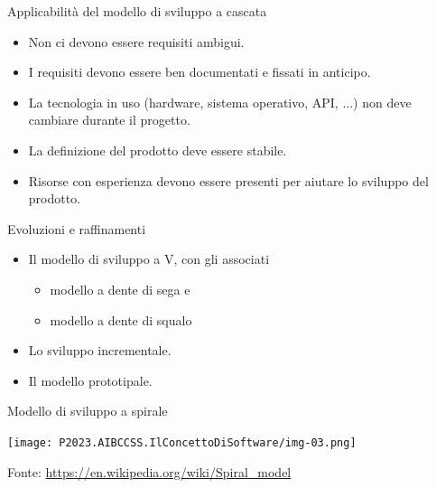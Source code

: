 \documentclass{beamer}
\begin{document}
\begin{frame}{\centerline{Applicabilit\`{a} del modello di sviluppo a cascata}}


\begin{itemize}

\item  Non ci devono essere requisiti ambigui.

\item  I requisiti devono essere ben documentati e fissati in anticipo.

\item  La tecnologia in uso (hardware, sistema operativo, API, ...) non deve cambiare durante il progetto.

\item  La definizione del prodotto deve essere stabile.

\item  Risorse con esperienza devono essere presenti per aiutare lo sviluppo del prodotto.
\end{itemize}

\end{frame}

\begin{frame}{\centerline{Evoluzioni e raffinamenti}}


\begin{itemize}

\item  Il modello di sviluppo a V, con gli associati
\begin{itemize}
\item modello a dente di sega e 
\item modello a dente di squalo
\end{itemize}

\item  Lo sviluppo incrementale.

\item  Il modello prototipale.

\end{itemize}

\end{frame}


\begin{frame}{\centerline{Modello di sviluppo a spirale}}

\begin{center}
\texttt{[image: P2023.AIBCCSS.IlConcettoDiSoftware/img-03.png]}
\end{center}

\begin{center}
\tiny
Fonte: \url{https://en.wikipedia.org/wiki/Spiral\_model}
\end{center}

\end{frame}
\end{document}
